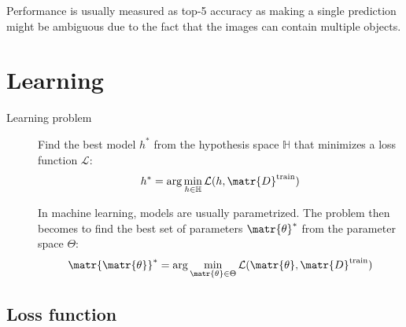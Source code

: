 \begin{remark}
    Performance is usually measured as top-5 accuracy as making a single prediction might be ambiguous due to the fact that the images can contain multiple objects.
\end{remark}



\section{Learning}

\begin{description}
    \item[Learning problem] 
        Find the best model $h^*$ from the hypothesis space $\mathbb{H}$ that minimizes a loss function $\mathcal{L}$:
        \[ h^* = \arg\min_{h \in \mathbb{H}} \mathcal{L}(h, \matr{D}^\text{train}) \]

        In machine learning, models are usually parametrized. The problem then becomes to find the best set of parameters $\matr{\theta}^*$ from the parameter space $\Theta$:
        \[ \matr{\matr{\theta}}^* = \arg\min_{\matr{\theta} \in \Theta} \mathcal{L}(\matr{\theta}, \matr{D}^\text{train}) \]
\end{description}


\subsection{Loss function}

